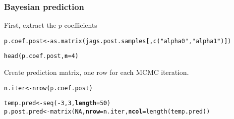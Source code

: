 \documentclass[color=usenames,dvipsnames]{beamer}\usepackage[]{graphicx}\usepackage[]{color}
\makeatletter
\newcommand{\hlnum}[1]{\textcolor[rgb]{0.69,0.494,0}{#1}}%
\newcommand{\hlstr}[1]{\textcolor[rgb]{0.749,0.012,0.012}{#1}}%
\newcommand{\hlopt}[1]{\textcolor[rgb]{0,0,0}{#1}}%
\newcommand{\hlstd}[1]{\textcolor[rgb]{0,0,0}{#1}}%
\newcommand{\hlkwb}[1]{\textcolor[rgb]{0,0.341,0.682}{#1}}%
\newcommand{\hlkwc}[1]{\textcolor[rgb]{0,0,0}{\textbf{#1}}}%
\newcommand{\hlkwd}[1]{\textcolor[rgb]{0.004,0.004,0.506}{#1}}%
\newenvironment{kframe}{%
 \def\at@end@of@kframe{}%
 \ifinner\ifhmode%
  \def\at@end@of@kframe{\end{minipage}}%
  \begin{minipage}{\columnwidth}%
 \fi\fi%
 \def\FrameCommand##1{\hskip\@totalleftmargin \hskip-\fboxsep
 \colorbox{shadecolor}{##1}\hskip-\fboxsep
     \hskip-\linewidth \hskip-\@totalleftmargin \hskip\columnwidth}%
 \MakeFramed {\advance\hsize-\width
   \@totalleftmargin\z@ \linewidth\hsize
   \@setminipage}}%
 {\par\unskip\endMakeFramed%
 \at@end@of@kframe}
\newenvironment{knitrout}{}{} %
\makeatother
\begin{document}
\begin{frame}[fragile]
  \frametitle{Bayesian prediction}
  \small
  First, extract the $p$ coefficients
  \vspace{-6pt}
\begin{knitrout}\scriptsize
{}\color{fgcolor}\begin{kframe}
\begin{alltt}
\hlstd{p.coef.post} \hlkwb{<-} \hlkwd{as.matrix}\hlstd{(jags.post.samples[,}\hlkwd{c}\hlstd{(}\hlstr{"alpha0"}\hlstd{,}\hlstr{"alpha1"}\hlstd{)])}
\end{alltt}


{\ttfamily\noindent\bfseries{}}\begin{alltt}
\hlkwd{head}\hlstd{(p.coef.post,} \hlkwc{n}\hlstd{=}\hlnum{4}\hlstd{)}
\end{alltt}


{\ttfamily\noindent\bfseries\color{errorcolor}{\#\# Error in h(simpleError(msg, call)): error in evaluating the argument 'x' in selecting a method for function 'head': object 'p.coef.post' not found}}\end{kframe}
\end{knitrout}
  \pause
  \vfill
  Create prediction matrix, one row for each MCMC iteration.
  \vspace{-6pt}
\begin{knitrout}\scriptsize
{}\color{fgcolor}\begin{kframe}
\begin{alltt}
\hlstd{n.iter} \hlkwb{<-} \hlkwd{nrow}\hlstd{(p.coef.post)}
\end{alltt}


{\ttfamily\noindent\bfseries\color{errorcolor}{\#\# Error in nrow(p.coef.post): object 'p.coef.post' not found}}\begin{alltt}
\hlstd{temp.pred} \hlkwb{<-} \hlkwd{seq}\hlstd{(}\hlopt{-}\hlnum{3}\hlstd{,} \hlnum{3}\hlstd{,} \hlkwc{length}\hlstd{=}\hlnum{50}\hlstd{)}
\hlstd{p.post.pred} \hlkwb{<-} \hlkwd{matrix}\hlstd{(}\hlnum{NA}\hlstd{,} \hlkwc{nrow}\hlstd{=n.iter,} \hlkwc{ncol}\hlstd{=}\hlkwd{length}\hlstd{(temp.pred))}
\end{alltt}



\end{kframe}
\end{knitrout}
\end{frame}
\end{document}
